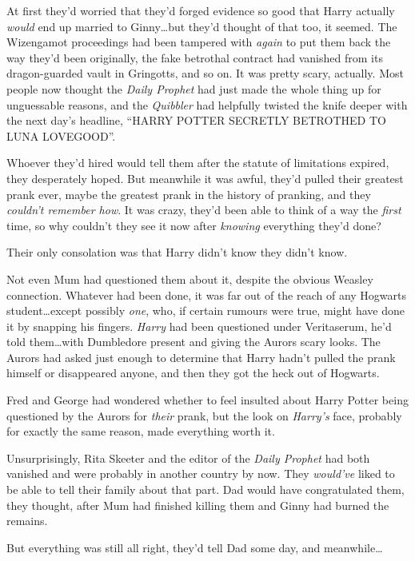 At first they’d worried that they’d forged evidence so good that Harry actually \emph{would} end up married to Ginny…but they’d thought of that too, it seemed. The Wizengamot proceedings had been tampered with \emph{again} to put them back the way they’d been originally, the fake betrothal contract had vanished from its dragon-guarded vault in Gringotts, and so on. It was pretty scary, actually. Most people now thought the \emph{Daily Prophet} had just made the whole thing up for unguessable reasons, and the \emph{Quibbler} had helpfully twisted the knife deeper with the next day’s headline, “HARRY POTTER SECRETLY BETROTHED TO LUNA LOVEGOOD”.

Whoever they’d hired would tell them after the statute of limitations expired, they desperately hoped. But meanwhile it was awful, they’d pulled their greatest prank ever, maybe the greatest prank in the history of pranking, and they \emph{couldn’t remember how}. It was crazy, they’d been able to think of a way the \emph{first} time, so why couldn’t they see it now after \emph{knowing} everything they’d done?

Their only consolation was that Harry didn’t know they didn’t know.

Not even Mum had questioned them about it, despite the obvious Weasley connection. Whatever had been done, it was far out of the reach of any Hogwarts student…except possibly \emph{one}, who, if certain rumours were true, might have done it by snapping his fingers. \emph{Harry} had been questioned under Veritaserum, he’d told them…with Dumbledore present and giving the Aurors scary looks. The Aurors had asked just enough to determine that Harry hadn’t pulled the prank himself or disappeared anyone, and then they got the heck out of Hogwarts.

Fred and George had wondered whether to feel insulted about Harry Potter being questioned by the Aurors for \emph{their} prank, but the look on \emph{Harry’s} face, probably for exactly the same reason, made everything worth it.

Unsurprisingly, Rita Skeeter and the editor of the \emph{Daily Prophet} had both vanished and were probably in another country by now. They \emph{would’ve} liked to be able to tell their family about that part. Dad would have congratulated them, they thought, after Mum had finished killing them and Ginny had burned the remains.

But everything was still all right, they’d tell Dad some day, and meanwhile…

